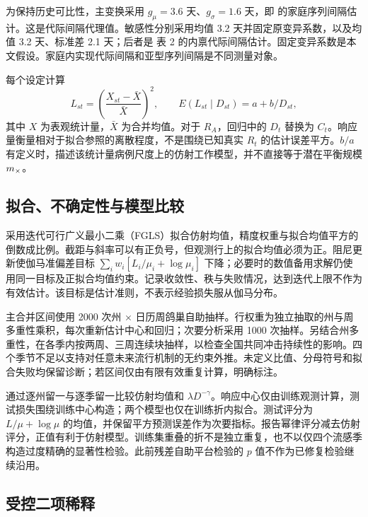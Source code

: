 为保持历史可比性，主变换采用 $g_\mu=3.6$ 天、$g_\sigma=1.6$ 天，即 \citet{cowling2009estimation} 的家庭序列间隔估计。这是代际间隔代理值。敏感性分别采用均值 3.2 天并固定原变异系数，以及均值 3.2 天、标准差 2.1 天；后者是 \citet{chan2025estimating} 表 2 的内禀代际间隔估计。固定变异系数是本文假设。家庭内实现代际间隔和亚型序列间隔是不同测量对象\citep{chan2025estimating,vink2014serial}。

每个设定计算
\begin{equation}
L_{st}=\left(\frac{X_{st}-\bar X}{\bar X}\right)^2,
\qquad E(L_{st}\mid D_{st})=a+b/D_{st},
\label{eq:affine}
\end{equation}
其中 $X$ 为表观统计量，$\bar X$ 为合并均值。对于 $R_A$，回归中的 $D_t$ 替换为 $C_t$。响应量衡量相对于拟合参照的离散程度，不是围绕已知真实 $R_t$ 的估计误差平方。$b/a$ 有定义时，描述该统计量病例尺度上的仿射工作模型，并不直接等于潜在平衡规模 $m_{\times}$。

\subsection{拟合、不确定性与模型比较}
\label{sec:meth-inference}

采用迭代可行广义最小二乘（FGLS）拟合仿射均值，精度权重与拟合均值平方的倒数成比例。截距与斜率可以有正负号，但观测行上的拟合均值必须为正。阻尼更新使伽马准偏差目标 $\sum_iw_i[L_i/\mu_i+\log\mu_i]$ 下降；必要时的数值备用求解仍使用同一目标及正拟合均值约束。记录收敛性、秩与失败情况，达到迭代上限不作为有效估计。该目标是估计准则，不表示经验损失服从伽马分布。

主合并区间使用 2000 次州 $\times$ 日历周鸽巢自助抽样\citep{owen2007pigeonhole}。行权重为独立抽取的州与周多重性乘积，每次重新估计中心和回归；次要分析采用 1000 次抽样。另结合州多重性，在各季内按两周、三周连续块抽样，以检查全国共同冲击持续性的影响。四个季节不足以支持对任意未来流行机制的无约束外推。未定义比值、分母符号和拟合失败均保留诊断；若区间仅由有限有效重复计算，明确标注。

通过逐州留一与逐季留一比较仿射均值和 $\lambda D^{-\gamma}$。响应中心仅由训练观测计算，测试损失围绕训练中心构造；两个模型也仅在训练折内拟合。测试评分为 $L/\mu+\log\mu$ 的均值，并保留平方预测误差作为次要指标。报告幂律评分减去仿射评分，正值有利于仿射模型。训练集重叠的折不是独立重复，也不以仅四个流感季构造过度精确的显著性检验。此前残差自助平台检验的 $p$ 值不作为已修复检验继续沿用。

\subsection{受控二项稀释}
\label{sec:meth-thinning}

